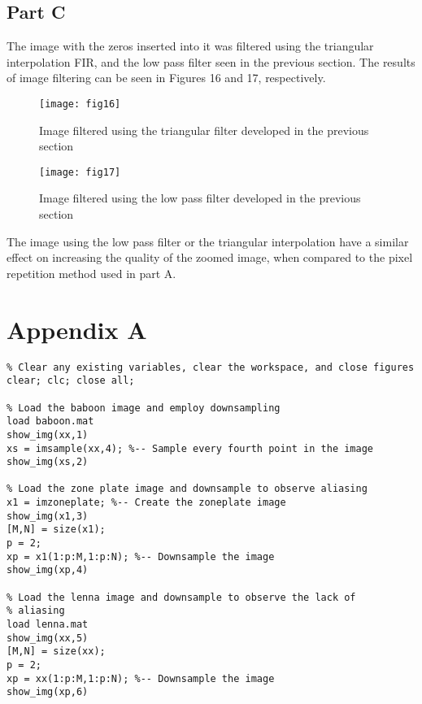 \documentclass{article}
\begin{document}
\subsection{Part C}
The image with the zeros inserted into it was filtered using the triangular interpolation FIR, and the low pass filter seen in the previous section. The results of image filtering can be seen in Figures 16 and 17, respectively.
\begin{figure}[H]
	\begin{minipage}[t][][b]{0.48\linewidth}
		\centering
		\texttt{[image: fig16]}
		\caption{Image filtered using the triangular filter developed in the previous section}
	\end{minipage}
\hspace{0.5cm}
	\begin{minipage}[t][][b]{0.48\linewidth}
		\centering
		\texttt{[image: fig17]}
		\caption{Image filtered using the low pass filter developed in the previous section}
	\end{minipage}
\end{figure} 

The image using the low pass filter or the triangular interpolation have a similar effect on increasing the quality of the zoomed image, when compared to the pixel repetition method used in part A.

\newpage

\section{Appendix A}
\begin{lstlisting}
% Clear any existing variables, clear the workspace, and close figures
clear; clc; close all;

% Load the baboon image and employ downsampling
load baboon.mat
show_img(xx,1)
xs = imsample(xx,4); %-- Sample every fourth point in the image
show_img(xs,2)

% Load the zone plate image and downsample to observe aliasing
x1 = imzoneplate; %-- Create the zoneplate image
show_img(x1,3)
[M,N] = size(x1);
p = 2;
xp = x1(1:p:M,1:p:N); %-- Downsample the image
show_img(xp,4)

% Load the lenna image and downsample to observe the lack of
% aliasing
load lenna.mat
show_img(xx,5)
[M,N] = size(xx);
p = 2;
xp = xx(1:p:M,1:p:N); %-- Downsample the image
show_img(xp,6)
\end{lstlisting}

\newpage
\end{document}
